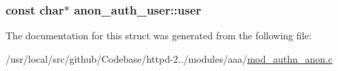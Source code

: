 \subsubsection[{\texorpdfstring{user}{user}}]{\setlength{\rightskip}{0pt plus 5cm}const char$\ast$ anon\+\_\+auth\+\_\+user\+::user}\hypertarget{structanon__auth__user_a3687e328431193fe0701293d1d994454}{}\label{structanon__auth__user_a3687e328431193fe0701293d1d994454}


The documentation for this struct was generated from the following file\+:\begin{DoxyCompactItemize}
\item 
/usr/local/src/github/\+Codebase/httpd-\/2../modules/aaa/\hyperlink{mod__authn__anon_8c}{mod\+\_\+authn\+\_\+anon.\+c}\end{DoxyCompactItemize}

